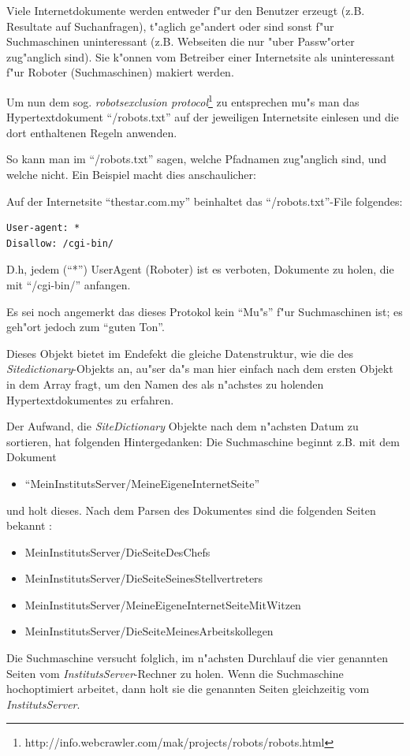 \begin{description}
Viele Internetdokumente werden entweder f"ur den Benutzer erzeugt (z.B. Resultate auf Suchanfragen), t"aglich ge"andert oder sind sonst f"ur Suchmaschinen uninteressant (z.B. Webseiten die nur "uber Passw"orter zug"anglich sind). Sie k"onnen vom Betreiber einer Internetsite als uninteressant f"ur Roboter (Suchmaschinen) makiert werden.

Um nun dem sog. {\em robotsexclusion protocol}\footnote{http://info.webcrawler.com/mak/projects/robots/robots.html} zu entsprechen mu"s man das Hypertextdokument "`/robots.txt"' auf der jeweiligen Internetsite einlesen und die dort enthaltenen Regeln anwenden.

So kann man im "`/robots.txt"' sagen, welche Pfadnamen zug"anglich sind, und welche nicht. Ein Beispiel macht dies anschaulicher:

Auf der Internetsite "`thestar.com.my"' beinhaltet das "`/robots.txt"'-File folgendes:
\begin{verbatim}
User-agent: *
Disallow: /cgi-bin/
\end{verbatim}
D.h, jedem ("`*"') UserAgent (Roboter) ist es verboten, Dokumente zu holen, die mit "`/cgi-bin/"' anfangen.

Es sei noch angemerkt das dieses Protokol kein "`Mu"s"' f"ur Suchmaschinen ist; es geh"ort jedoch zum "`guten Ton"'.


\item[Sites sorted by nextaccess:] Dieses Objekt bietet im Endefekt die gleiche Datenstruktur, wie die des {\em Sitedictionary}-Objekts an, au"ser da"s man hier einfach nach dem ersten Objekt in dem Array fragt, um den Namen des als n"achstes zu holenden Hypertextdokumentes zu erfahren.

Der Aufwand, die {\em SiteDictionary} Objekte nach dem n"achsten Datum zu sortieren, hat folgenden Hintergedanken: Die Suchmaschine beginnt z.B. mit dem Dokument 
\begin{itemize}
	\item "`MeinInstitutsServer/MeineEigeneInternetSeite"' 
\end{itemize}
und holt dieses. Nach dem Parsen des Dokumentes sind die folgenden Seiten bekannt :
\begin{itemize}
	\item	MeinInstitutsServer/DieSeiteDesChefs
	\item	MeinInstitutsServer/DieSeiteSeinesStellvertreters
	\item	MeinInstitutsServer/MeineEigeneInternetSeiteMitWitzen
	\item	MeinInstitutsServer/DieSeiteMeinesArbeitskollegen
\end{itemize}
Die Suchmaschine versucht folglich, im n"achsten Durchlauf die vier genannten Seiten vom {\em InstitutsServer}-Rechner zu holen. Wenn die Suchmaschine hochoptimiert arbeitet, dann holt sie die genannten Seiten gleichzeitig vom {\em InstitutsServer}.


\end{description}
